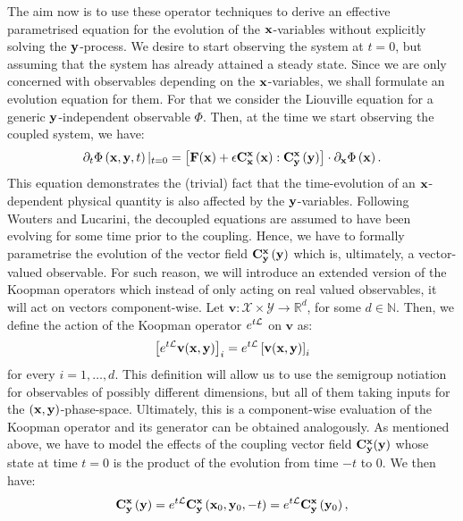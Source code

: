 \documentclass[12pt]{article}
\begin{document}
The aim now is to use these operator techniques to derive an effective parametrised equation for the evolution of the $\mathbf{x}$-variables without explicitly solving the $\mathbf{y}$-process. We desire to start observing the system at $t=0$, but assuming that the system has already attained a steady state. Since we are only concerned with observables depending on the $\mathbf{x}$-variables, we shall formulate an evolution equation for them. For that we consider the Liouville equation for a generic $\mathbf{y}$-independent observable $\Phi$. Then, at the time we start observing the coupled system, we have:
\begin{equation}\label{init liouville}
	\partial _t \Phi \left( \mathbf{x} , \mathbf{y} , t \right)|_{t=0} = \left[ \mathbf{F}(\mathbf{x}) + \epsilon \mathbf{C}_{\mathbf{x}}^{\mathbf{x}}\left(\mathbf{x} \right):\mathbf{C}_{\mathbf{y}}^{\mathbf{x}}\left(\mathbf{y} \right)  \right]\cdot \partial _{\mathbf{x}}\Phi \left(\mathbf{x} \right).
\end{equation}
This equation demonstrates the (trivial) fact that the time-evolution of an $\mathbf{x}$-dependent physical quantity is also affected by the $\mathbf{y}$-variables. Following Wouters and Lucarini, the decoupled equations are assumed to have been evolving for some time prior to the coupling. Hence, we have to formally parametrise the evolution of the vector field $\mathbf{C}_{\mathbf{y}}^{\mathbf{x}}\left(\mathbf{y} \right)$ which is, ultimately, a vector-valued observable. For such reason, we will introduce an extended version of the Koopman operators which instead of only acting on real valued observables, it will act on vectors component-wise. Let $\mathbf{v}: \mathcal{X}\times \mathcal{Y}\longrightarrow \mathbb{R}^d$, for some $d\in \mathbb{N}$. Then, we define the action of the Koopman operator $e^{t\mathcal{L}}$ on $\mathbf{v}$ as:
\begin{equation}
	\left[e^{t\mathcal{L}}\mathbf{v}(\mathbf{x},\mathbf{y})\right]_i = e^{t\mathcal{L}}\left[\mathbf{v}(\mathbf{x},\mathbf{y})\right]_i
\end{equation}
for every $i=1,\ldots,d$. This definition will allow us to use the semigroup notiation for observables of possibly different dimensions, but all of them taking inputs for the $(\mathbf{x},\mathbf{y})$-phase-space. Ultimately, this is a component-wise evaluation of the Koopman operator and its generator can be obtained analogously. As mentioned above, we have to model the effects of the coupling vector field $\mathbf{C} _{\mathbf{y}}^{\mathbf{x}}(\mathbf{y})$ whose state at time $t=0$ is the product of the evolution from time $-t$ to $0$. We then have:
\begin{equation}
	\mathbf{C}_{\mathbf{y}}^{\mathbf{x}}\left(\mathbf{y} \right) = e^{t\mathcal{L}}\mathbf{C}_{\mathbf{y}}^{\mathbf{x}}\left(\mathbf{x}_0,\mathbf{y}_0,-t \right)=e^{t\mathcal{L}}\mathbf{C}_{\mathbf{y}}^{\mathbf{x}}\left(\mathbf{y}_0 \right),
\end{equation}
\end{document}
